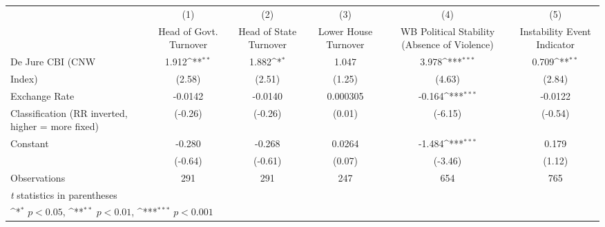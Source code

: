 {
\def\sym#1{\ifmmode^{#1}\else\(^{#1}\)\fi}
\begin{tabular}{l*{5}{c}}
\toprule
                &\multicolumn{1}{c}{(1)}&\multicolumn{1}{c}{(2)}&\multicolumn{1}{c}{(3)}&\multicolumn{1}{c}{(4)}&\multicolumn{1}{c}{(5)}\\
                &\multicolumn{1}{c}{Head of Govt. Turnover}&\multicolumn{1}{c}{Head of State Turnover}&\multicolumn{1}{c}{Lower House Turnover}&\multicolumn{1}{c}{WB Political Stability (Absence of Violence)}&\multicolumn{1}{c}{Instability Event Indicator}\\
\midrule
De Jure CBI (CNW&    1.912\sym{**} &    1.882\sym{*}  &    1.047         &    3.978\sym{***}&    0.709\sym{**} \\
Index)          &   (2.58)         &   (2.51)         &   (1.25)         &   (4.63)         &   (2.84)         \\
\addlinespace
Exchange Rate   &  -0.0142         &  -0.0140         & 0.000305         &   -0.164\sym{***}&  -0.0122         \\
Classification (RR inverted, higher = more fixed)&  (-0.26)         &  (-0.26)         &   (0.01)         &  (-6.15)         &  (-0.54)         \\
\addlinespace
Constant        &   -0.280         &   -0.268         &   0.0264         &   -1.484\sym{***}&    0.179         \\
                &  (-0.64)         &  (-0.61)         &   (0.07)         &  (-3.46)         &   (1.12)         \\
\midrule
Observations    &      291         &      291         &      247         &      654         &      765         \\
\bottomrule
\multicolumn{6}{l}{\footnotesize \textit{t} statistics in parentheses}\\
\multicolumn{6}{l}{\footnotesize \sym{*} \(p<0.05\), \sym{**} \(p<0.01\), \sym{***} \(p<0.001\)}\\
\end{tabular}
}
